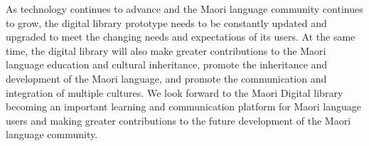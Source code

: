 As technology continues to advance and the Maori language community continues to grow, the digital library prototype needs to be constantly updated and upgraded to meet the changing needs and expectations of its users. At the same time, the digital library will also make greater contributions to the Maori language education and cultural inheritance, promote the inheritance and development of the Maori language, and promote the communication and integration of multiple cultures. We look forward to the Maori Digital library becoming an important learning and communication platform for Maori language users and making greater contributions to the future development of the Maori language community.
